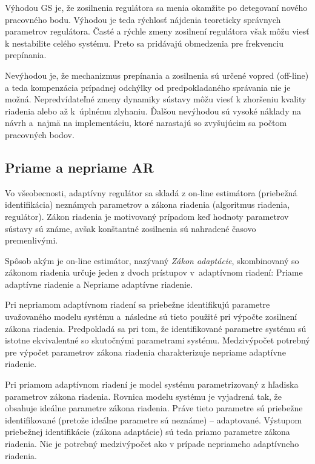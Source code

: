 \documentclass[a4paper, 10pt, ]{article}
\begin{document}
Výhodou GS je, že zosilnenia regulátora sa menia okamžite po detegovaní nového pracovného bodu. Výhodou je teda rýchlosť nájdenia teoreticky správnych parametrov regulátora. Časté a rýchle zmeny zosilnení regulátora však môžu viesť k nestabilite celého systému. Preto sa pridávajú obmedzenia pre frekvenciu prepínania.

Nevýhodou je, že mechanizmus prepínania a zosilnenia sú určené vopred (off-line) a teda kompenzácia prípadnej odchýlky od predpokladaného správania nie je možná. Nepredvídateľné zmeny dynamiky sústavy môžu viesť k zhoršeniu kvality riadenia alebo až k~úplnému zlyhaniu. Ďalšou nevýhodou sú vysoké náklady na návrh a~najmä na implementáciu, ktoré narastajú so zvyšujúcim sa počtom pracovných bodov.



\subsection{Priame a nepriame AR}

Vo všeobecnosti, adaptívny regulátor sa skladá z on-line estimátora (priebežná identifikácia) neznámych parametrov a zákona riadenia (algoritmus riadenia, regulátor). Zákon riadenia je motivovaný prípadom keď hodnoty parametrov sústavy sú známe, avšak konštantné zosilnenia sú nahradené časovo premenlivými.

Spôsob akým je on-line estimátor, nazývaný \emph{Zákon adaptácie}, skombinovaný so zákonom riadenia určuje jeden z dvoch prístupov v~adaptívnom riadení: Priame adaptívne riadenie a Nepriame adaptívne riadenie.

Pri nepriamom adaptívnom riadení sa priebežne identifikujú parametre uvažovaného modelu systému a~následne sú tieto použité pri výpočte zosilnení zákona riadenia. Predpokladá sa pri tom, že identifikované parametre systému sú istotne ekvivalentné so skutočnými parametrami systému. Medzivýpočet potrebný pre výpočet parametrov zákona riadenia charakterizuje nepriame adaptívne riadenie.

Pri priamom adaptívnom riadení je model systému parametrizovaný z hľadiska parametrov zákona riadenia. Rovnica modelu systému je vyjadrená tak, že obsahuje ideálne parametre zákona riadenia. Práve tieto parametre sú priebežne identifikované (pretože ideálne parametre sú neznáme) -- adaptované. Výstupom priebežnej identifikácie (zákona adaptácie) sú teda priamo parametre zákona riadenia. Nie je potrebný medzivýpočet ako v prípade nepriameho adaptívneho riadenia.
\end{document}

